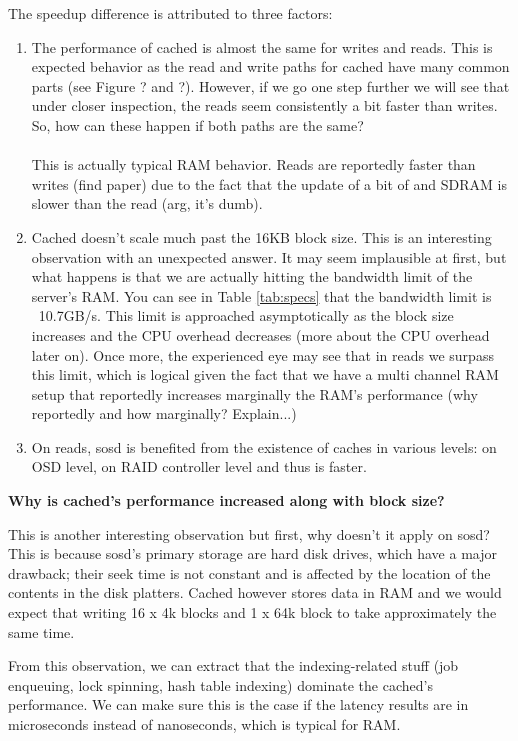 The speedup difference is attributed to three factors:

\begin{enumerate}
	\item The performance of cached is almost the same for writes and 
		reads.  This is expected behavior as the read and write paths 
		for cached have many common parts (see Figure ? and ?).  
		However, if we go one step further we will see that under 
		closer inspection, the reads seem consistently a bit faster 
		than writes. So, how can these happen if both paths are the 
		same? \\
		\\
		This is actually typical RAM behavior. Reads are reportedly 
		faster than writes (find paper) due to the fact that the update 
		of a bit of and SDRAM is slower than the read (arg, it's dumb).
	\item Cached doesn't scale much past the 16KB block size. This is an 
		interesting observation with an unexpected answer. It may seem 
		implausible at first, but what happens is that we are actually 
		hitting the bandwidth limit of the server's RAM. You can see in 
		Table \ref{tab:specs} that the bandwidth limit is ~10.7GB/s. 
		This limit is approached asymptotically as the block size 
		increases and the CPU overhead decreases (more about the CPU 
		overhead later on). Once more, the experienced eye may see that 
		in reads we surpass this limit, which is logical given the fact 
		that we have a multi channel RAM setup that reportedly 
		increases marginally the RAM's performance (why reportedly and 
		how marginally? Explain...)
	\item On reads, sosd is benefited from the existence of caches in 
		various levels: on OSD level, on RAID controller level and thus 
		is faster.
\end{enumerate}

\textbf{Why is cached's performance increased along with block size?}

This is another interesting observation but first, why doesn't it apply on 
sosd? This is because sosd's primary storage are hard disk drives, which have a 
major drawback; their seek time is not constant and is affected by the location 
of the contents in the disk platters. Cached however stores data in RAM and we 
would expect that writing 16 x 4k blocks and 1 x 64k block to take 
approximately the same time.

From this observation, we can extract that the indexing-related stuff (job 
enqueuing, lock spinning, hash table indexing) dominate the cached's 
performance. We can make sure this is the case if the latency results are in
microseconds instead of nanoseconds, which is typical for RAM.

